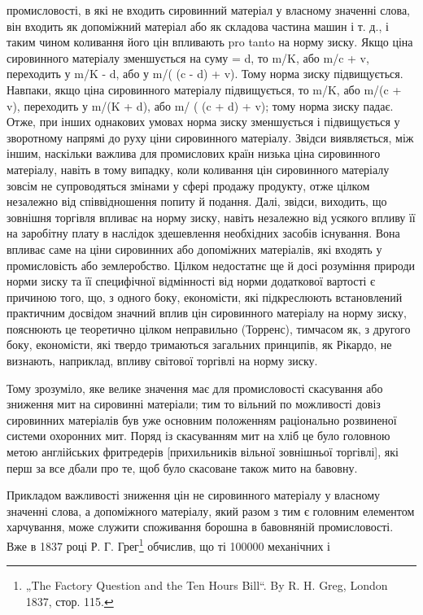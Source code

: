\parcont{}  %
промисловості, в які не входить сировинний матеріал у власному значенні слова, він входить як
допоміжний матеріал або як складова частина машин і т. д., і таким чином коливання його цін
впливають pro tanto на норму зиску. Якщо ціна сировинного матеріалу зменшується на суму = d, то m/K,
або m/c + v, переходить у m/K - d, або у
m/( (c - d) + v). Тому норма зиску підвищується. Навпаки, якщо ціна сировинного матеріалу
підвищується, то m/K, або m/(c + v), переходить у m/(K + d), або m/ ( (c + d) + v); тому норма зиску
падає. Отже, при інших однакових умовах норма
зиску зменшується і підвищується у зворотному напрямі до руху ціни сировинного матеріалу. Звідси
виявляється, між іншим, наскільки важлива для промислових країн низька ціна сировинного матеріалу,
навіть в тому випадку, коли коливання цін сировинного матеріалу зовсім не супроводяться змінами у
сфері продажу продукту, отже цілком незалежно від співвідношення попиту й подання. Далі, звідси,
виходить, що зовнішня торгівля впливає на норму зиску, навіть незалежно від усякого впливу її на
заробітну плату в наслідок здешевлення необхідних засобів існування. Вона впливає саме на ціни
сировинних або допоміжних матеріалів, які входять у промисловість або землеробство. Цілком
недостатнє ще й досі розуміння природи норми зиску та її специфічної відмінності від норми
додаткової вартості є причиною того, що, з одного боку, економісти, які підкреслюють встановлений
практичним досвідом значний вплив цін сировинного матеріалу на норму зиску, пояснюють це теоретично
цілком неправильно (Торренс), тимчасом як, з другого боку, економісти, які твердо тримаються
загальних принципів, як Рікардо, не визнають, наприклад, впливу світової торгівлі на норму зиску.

Тому зрозуміло, яке велике значення має для промисловості скасування або зниження мит на сировинні
матеріали; тим то вільний по можливості довіз сировинних матеріалів був уже основним положенням
раціонально розвиненої системи охоронних мит. Поряд із скасуванням мит на хліб це було головною
метою англійських фритредерів [прихильників вільної зовнішньої торгівлі], які перш за все дбали про
те, щоб було скасоване також мито на бавовну.

Прикладом важливості зниження цін не сировинного матеріалу у власному значенні слова, а допоміжного
матеріалу, який разом з тим є головним елементом харчування, може служити споживання борошна в
бавовняній промисловості. Вже в 1837 році Р. Г. Грег\footnote{
„The Factory Question and the Ten Hours Bill“. By R. H. Greg, London 1837, стор. 115.
} обчислив, що ті 100000 механічних і
\parbreak{}  %

